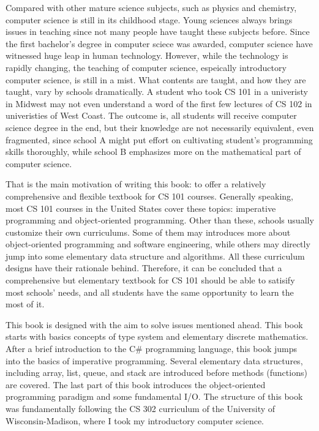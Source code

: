 \documentclass[../main.tex]{subfiles}
\begin{document}
    \par Compared with other mature science subjects, such as physics and chemistry,
    computer science is still in its childhood stage. Young sciences always brings
    issues in teaching since not many people have taught these subjects before.
    Since the first bachelor's degree in computer sciece was awarded, computer
    science have witnessed huge leap in human technology. However, while the
    technology is rapidly changing, the teaching of computer science, espeically
    introductory computer science, is still in a mist. What contents are taught,
    and how they are taught, vary by schools dramatically. A student who took CS
    101 in a univeristy in Midwest may not even understand a word of the first few
    lectures of CS 102 in univeristies of West Coast. The outcome is, all students
    will receive computer science degree in the end, but their knowledge are not
    necessarily equivalent, even fragmented, since school A might put effort on
    cultivating student's programming skills thoroughly, while school B emphasizes
    more on the mathematical part of computer science.

    \par That is the main motivation of writing this book: to offer a relatively
    comprehensive and flexible textbook for CS 101 courses. Generally speaking,
    most CS 101 courses in the United States cover these topics: imperative
    programming and object-oriented programming. Other than these, schools
    usually customize their own curriculums. Some of them may introduces more about
    object-oriented programming and software engineering, while others may directly
    jump into some elementary data structure and algorithms. All these curriculum
    designs have their rationale behind. Therefore, it can be concluded that a
    comprehensive but elementary textbook for CS 101 should be able to satisify most
    schools' needs, and all students have the same opportunity to learn the most of it.

    \par This book is designed with the aim to solve issues mentioned ahead. This book
    starts with basics concepts of type system and elementary discrete mathematics.
    After a brief introduction to the C\# programming language, this book jumps into
    the basics of imperative programming. Several elementary data structures,
    including array, list, queue, and stack are introduced before methods
    (functions) are covered. The last part of this book introduces the
    object-oriented programming paradigm and some fundamental I/O. The structure of
    this book was fundamentally following the CS 302 curriculum of the University of
    Wisconsin-Madison, where I took my introductory computer science.
\end{document}
